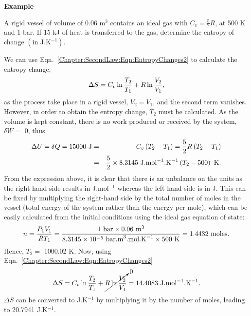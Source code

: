    \begin{MyExample}{\begin{center}{\bf Example}\end{center}}
     \begin{example}\label{Chapter:SecondLaw:Example5}\citep{SmithVanNess_Book}
         A rigid vessel of volume of 0.06 m$^{3}$ contains an ideal gas with $C_{v}=\frac{5}{2}R$, at 500 K and 1 bar. If 15 kJ of heat is transferred to the gas, determine the entropy of change $\left(\text{in J.K}^{-1}\right)$.
     \end{example}

            We can use Eqn.~\ref{Chapter:SecondLaw:Eqn:EntropyChanges2} to calculate the entropy change,
               \begin{displaymath}
                  \Delta S = C_{v}\ln{\displaystyle\frac{T_{2}}{T_{1}}} + R\ln{\displaystyle\frac{V_{2}}{V_{1}}},
               \end{displaymath}
               as the process take place in a rigid vessel, $V_{2}=V_{1}$, and the second term vanishes. However, in order to obtain the entropy change, $T_{2}$ must be calculated. As the volume is kept constant, there is no work produced or received by the system, $\delta W=$ 0, thus
              \begin{eqnarray}
                  \Delta U = \delta Q = 15000\text{ J} &=& C_{v}\left(T_{2}-T_{1}\right) =  \displaystyle\frac{5}{2}R\left(T_{2}-T_{1}\right) \nonumber \\
                                                       &=& \displaystyle\frac{5}{2} \times 8.3145\text{ J.mol}^{-1}\text{.K}^{-1}\left(T_{2}- 500\right)\text{ K}. \nonumber  
              \end{eqnarray}
              From the expression above, it is clear that there is an unbalance on the units as the right-hand side results in J.mol$^{-1}$ whereas the left-hand side is in J. This can be fixed by multiplying the right-hand side by the total number of moles in the vessel (\ie total energy of the system rather than the energy per mole), which can be easily calculated from the initial conditions using the ideal gas equation of state:  
              \begin{displaymath}
                  n = \displaystyle\frac{P_{1}V_{1}}{RT_{1}} = \displaystyle\frac{1\text{ bar}\times 0.06\text{ m}^{3}}{8.3145\times 10^{-5}\text{ bar.m}^{3}\text{.mol.K}^{-1} \times 500\text{ K}} = 1.4432\text{ moles}.
              \end{displaymath}
              Hence, $T_{2}=$ 1000.02 K. Now, using Eqn.~\ref{Chapter:SecondLaw:Eqn:EntropyChanges2}
               \begin{displaymath}
                  \Delta S = C_{v}\ln{\displaystyle\frac{T_{2}}{T_{1}}} + \cancelto{0}{R\ln{\displaystyle\frac{V_{2}}{V_{1}}}} = 14.4083\text{ J.mol}^{-1}\text{.K}^{-1}.
               \end{displaymath}
              $\Delta S$ can be converted to J.K$^{-1}$ by multiplying it by the number of moles, leading to 20.7941 J.K$^{-1}$.

   \end{MyExample}

